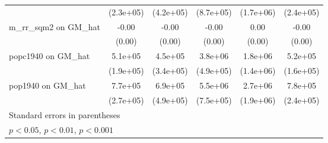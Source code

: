 \begin{table}[htbp]
\begin{tabular}{l*{5}{c}}
                &(2.3e+05)         &(4.2e+05)         &(8.7e+05)         &(1.7e+06)         &(2.4e+05)         \\
\addlinespace
m\_rr\_sqm2 on GM\_hat&    -0.00         &    -0.00         &    -0.00         &     0.00         &    -0.00         \\
                &   (0.00)         &   (0.00)         &   (0.00)         &   (0.00)         &   (0.00)         \\
\addlinespace
popc1940 on GM\_hat&  5.1e+05\sym{**} &  4.5e+05         &  3.8e+06\sym{***}&  1.8e+06         &  5.2e+05\sym{**} \\
                &(1.9e+05)         &(3.4e+05)         &(4.9e+05)         &(1.4e+06)         &(1.6e+05)         \\
\addlinespace
pop1940 on GM\_hat&  7.7e+05\sym{**} &  6.9e+05         &  5.5e+06\sym{***}&  2.7e+06         &  7.8e+05\sym{**} \\
                &(2.7e+05)         &(4.9e+05)         &(7.5e+05)         &(1.9e+06)         &(2.4e+05)         \\
\bottomrule
\multicolumn{6}{l}{\footnotesize Standard errors in parentheses}\\
\multicolumn{6}{l}{\footnotesize \sym{*} \(p<0.05\), \sym{**} \(p<0.01\), \sym{***} \(p<0.001\)}\\
\end{tabular}
\end{table}
